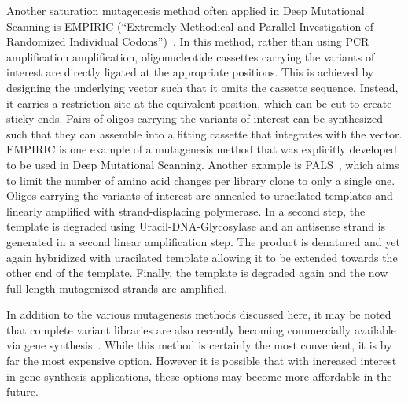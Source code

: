 Another saturation mutagenesis method often applied in Deep Mutational Scanning is EMPIRIC (``Extremely Methodical and Parallel Investigation of Randomized Individual Codons'')~\cite{hietpas_experimental_2011}. In this method, rather than using PCR amplification amplification, oligonucleotide cassettes carrying the variants of interest are directly ligated at the appropriate positions. This is achieved by designing the underlying vector such that it omits the cassette sequence. Instead, it carries a restriction site at the equivalent position, which can be cut to create sticky ends. Pairs of oligos carrying the variants of interest can be synthesized such that they can assemble into a fitting cassette that integrates with the vector.
EMPIRIC is one example of a mutagenesis method that was explicitly developed to be used in Deep Mutational Scanning. Another example is PALS~\cite{kitzmann_massively_2015}, which aims to limit the number of amino acid changes per library clone to only a single one. Oligos carrying the variants of interest are annealed to uracilated templates and linearly amplified with strand-displacing polymerase. In a second step, the template is degraded using Uracil-DNA-Glycosylase and an antisense strand is generated in a second linear amplification step. The product is denatured and yet again hybridized with uracilated template allowing it to be extended towards the other end of the template. Finally, the template is degraded again and the now full-length mutagenized strands are amplified.

In addition to the various mutagenesis methods discussed here, it may be noted that complete variant libraries are also recently becoming commercially available via gene synthesis~\cite{kosuri_scalable_2010}. While this method is certainly the most convenient, it is by far the most expensive option. However it is possible that with increased interest in gene synthesis applications, these options may become more affordable in the future.


